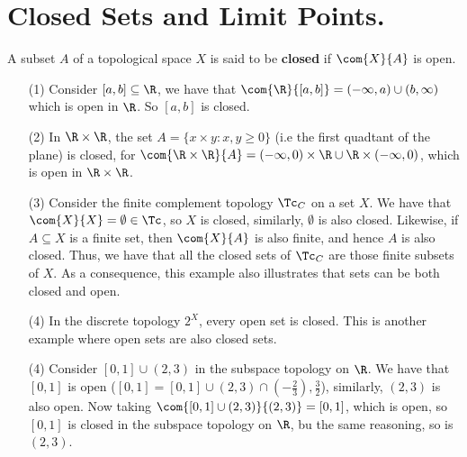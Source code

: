 
\section{Closed Sets and Limit Points.}

\begin{definition}
    A subset $A$ of a topological space  $X$ is said to be  \textbf{closed} if
    $\com{X}{A}$ is open.
\end{definition}

\begin{example}
    \begin{enumerate}
        \item[(1)] Consider $[a,b] \subseteq \R$, we have that
            $\com{\R}{[a,b]}=(-\infty,a) \cup (b, \infty)$ which is open in
            $\R$. So  $[a,b]$ is closed.

        \item[(2)] In  $\R \times \R$, the set  $A=\{x \times y: x,y \geq 0\}$  (i.e
            the first quadtant of the plane) is closed, for $\com{\R \times
            \R}{A}=(- \infty,0) \times \R \cup \R \times (-\infty,0)$, which is
            open in $\R \times \R$.

        \item[(3)] Consider the finite complement topology $\Tc_C$ on a set  $X$. We
            have that  $\com{X}{X}=\emptyset \in \Tc$, so  $X$ is closed,
            similarly,  $\emptyset$ is also closed. Likewise, if  $A \subseteq
            X$ is a finite set, then  $\com{X}{A}$ is also finite, and hence $A$
            is also closed. Thus, we have that all the closed sets of  $\Tc_C$
            are those finite subsets of  $X$. As a consequence, this example also
            illustrates that sets can be both closed and open.

        \item[(4)] In the discrete topology  $2^X$, every open set is closed. This is
            another example where open sets are also closed sets.

        \item[(4)] Consider  $[0,1] \cup (2,3)$ in the subspace topology on $\R$. We
            have that  $[0,1]$ is open  ($[0,1]=[0,1] \cup (2,3) \cap
            (-\frac{2}{3}),\frac{3}{2}$), similarly, $(2,3)$ is also open. Now
            taking  $\com{[0,1] \cup (2,3)}{(2,3)}=[0,1]$, which is open, so
            $[0,1]$ is closed in the subspace topology on  $\R$, bu the same
            reasoning, so is  $(2,3)$.
    \end{enumerate}
\end{example}

